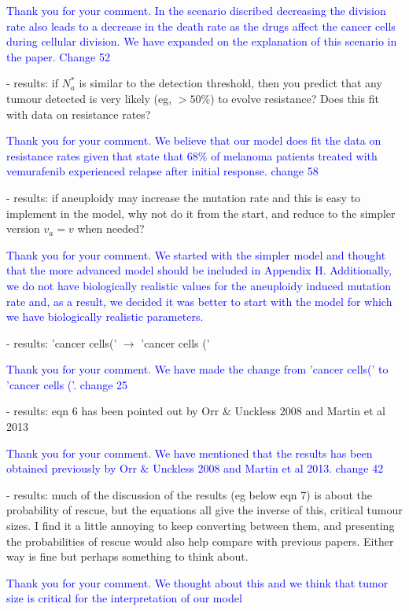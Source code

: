 \documentclass[11pt,a4paper]{article}
\begin{document}
\textcolor{blue}{Thank you for your comment. In the scenario discribed decreasing the division rate also leads to a decrease in the death rate as the drugs affect the cancer cells during cellular division. We have expanded on the explanation of this scenario in the paper. Change 52} 

- results: if $N_a^*$ is similar to the detection threshold, then you predict that any tumour detected is very likely (eg, $>50\%$) to evolve resistance? Does this fit with data on resistance rates?

\textcolor{blue}{Thank you for your comment.  We believe that our model does fit the data on resistance rates given that \citep{handa2022long} state that 68$\%$ of melanoma patients treated with vemurafenib experienced relapse after initial response. change 58}

- results: if aneuploidy may increase the mutation rate and this is easy to implement in the model, why not do it from the start, and reduce to the simpler version $v_a=v$ when needed?

\textcolor{blue}{Thank you for your comment. We started with the simpler model and thought that the more advanced model should be included in Appendix H. Additionally, we do not have biologically realistic values for the aneuploidy induced mutation rate and, as a result, we decided it was better to start with the model for which we have biologically realistic parameters. } 

- results: 'cancer cells(' $\rightarrow$ 'cancer cells ('

\textcolor{blue}{Thank you for your comment. We have made the change from 'cancer cells(' to 'cancer cells ('. change 25} 

- results: eqn 6 has been pointed out by Orr $\&$ Unckless 2008 and Martin et al 2013

\textcolor{blue}{Thank you for your comment. We have mentioned that the results has been obtained previously by Orr $\&$ Unckless 2008 and Martin et al 2013. change 42} 

- results: much of the discussion of the results (eg below eqn 7) is about the probability of rescue, but the equations all give the inverse of this, critical tumour sizes. I find it a little annoying to keep converting between them, and presenting the probabilities of rescue would also help compare with previous papers. Either way is fine but perhaps something to think about.

\textcolor{blue}{Thank you for your comment. We thought about this and we think that tumor size is critical for the interpretation of our model}
\end{document}
